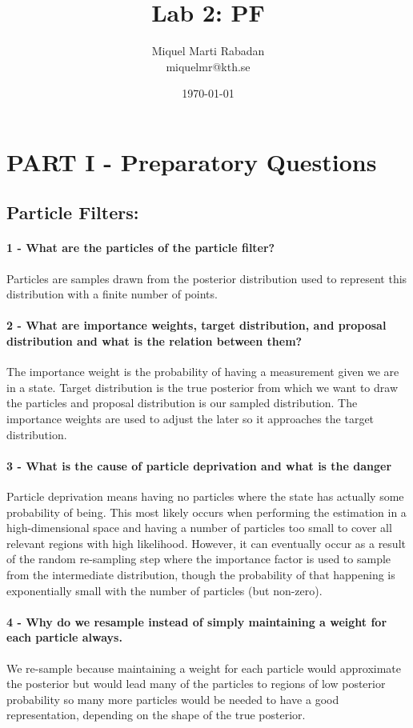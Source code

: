 \documentclass[12pt]{article}
\title{Lab 2: PF}
\author{
        Miquel Marti Rabadan\\
        miquelmr@kth.se
}
\date{\today}
\begin{document}
\maketitle


\section{PART I - Preparatory Questions}

\subsection*{Particle Filters:}

\paragraph{1 - What are the particles of the particle filter?} 
Particles are samples drawn from the posterior distribution used to represent this distribution with a finite number of points.

\paragraph{2 - What are importance weights, target distribution, and proposal distribution and what is the relation between them?}
The importance weight is the probability of having a measurement given we are in a state. Target distribution is the true posterior from which we want to draw the particles and proposal distribution is our sampled distribution. The importance weights are used to adjust the later so it approaches the target distribution.

\paragraph{3 - What is the cause of particle deprivation and what is the danger}
Particle deprivation means having no particles where the state has actually some probability of being. This most likely occurs when performing the estimation in a high-dimensional space and having a number of particles too small to cover all relevant regions with high likelihood. However, it can eventually occur as a result of the random re-sampling step where the importance factor is used to sample from the intermediate distribution, though the probability of that happening is exponentially small with the number of particles (but non-zero).

\paragraph{4 - Why do we resample instead of simply maintaining a weight for each particle always.}
We re-sample because maintaining a weight for each particle  would approximate the posterior but would lead many of the particles to regions of low posterior probability so many more particles would be needed to have a good representation, depending on the shape of the true posterior.
\end{document}
